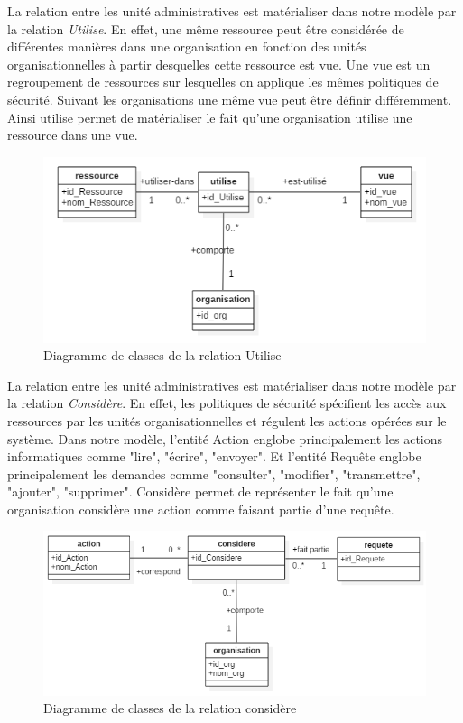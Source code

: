 La relation entre les unité administratives est matérialiser dans  notre modèle par la relation \textit{Utilise}. En effet, une même ressource peut être considérée de différentes manières dans une organisation en fonction des unités organisationnelles à partir desquelles cette ressource est vue. Une vue est un regroupement de ressources sur lesquelles on applique les mêmes politiques de sécurité. Suivant les organisations une même vue peut être définir différemment. Ainsi utilise permet de matérialiser le fait qu'une organisation utilise une ressource dans une vue.

\begin{figure}[h!]
    \centering
		\includegraphics[scale=0.7]{chap3/images/utilise.png}
    \caption{Diagramme de classes de la relation Utilise}
	 \label{figutilise}
\end{figure} 

\label{sectionActionRequêtes}

La relation entre les unité administratives est matérialiser dans  notre modèle par la relation \textit{Considère}. En effet, les politiques de sécurité spécifient les accès aux ressources par les unités organisationnelles et régulent les actions opérées sur le système. Dans notre modèle, l'entité Action englobe principalement les actions informatiques comme "lire", "écrire", "envoyer". Et l'entité Requête englobe principalement les demandes comme "consulter", "modifier", "transmettre", "ajouter", "supprimer". Considère permet de représenter le fait qu'une  organisation considère une action comme faisant partie d'une requête.

\begin{figure}[h!]
    \centering
		\includegraphics[scale=0.7]{chap3/images/considere.png}
    \caption{Diagramme de classes de la relation considère}
	 \label{figconsidere}
\end{figure} 

